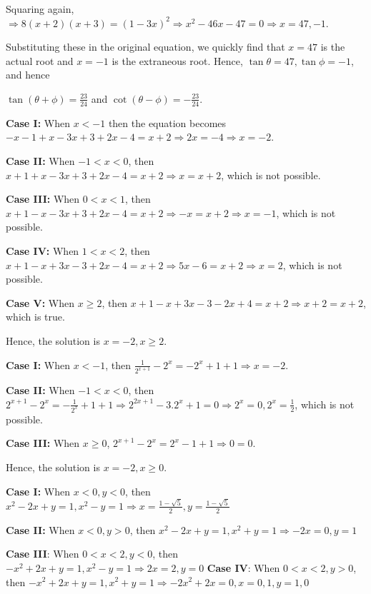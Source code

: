   Squaring again, $\Rightarrow 8(x + 2)(x + 3) = (1 - 3x)^2 \Rightarrow x^2 - 46x - 47 = 0 \Rightarrow x =
  47, -1$.

  Substituting these in the original equation, we quickly find that $x = 47$ is the actual root and $x = -1$
  is the extraneous root. Hence, $\tan\theta = 47, \tan\phi = -1$, and hence

  $\tan(\theta + \phi) = \frac{23}{24}$ and $\cot(\theta - \phi) = -\frac{23}{24}$.
\item {\bf Case I:} When $x < -1$ then the equation becomes $-x - 1 + x - 3x + 3 + 2x - 4 = x + 2 \Rightarrow
  2x = -4\Rightarrow x = -2$.

  {\bf Case II:} When $-1 < x < 0$, then $x + 1 + x - 3x + 3 + 2x - 4 = x + 2\Rightarrow x = x + 2$,
  which is not possible.

  {\bf Case III:} When $0 < x < 1$, then $x + 1 - x - 3x + 3 + 2x - 4 = x + 2 \Rightarrow -x = x + 2
  \Rightarrow x = -1$, which is not possible.

  {\bf Case IV:} When $1 < x < 2$, then $x + 1 - x + 3x - 3 + 2x - 4 = x + 2 \Rightarrow 5x - 6 = x +
  2\Rightarrow x = 2$, which is not possible.

  {\bf Case V:} When $x \geq 2$, then $x + 1 - x + 3x - 3 - 2x + 4 = x + 2 \Rightarrow x + 2 = x + 2$, which
  is true.

  Hence, the solution is $x = -2, x\geq 2$.
\item {\bf Case I:} When $x < -1$, then $\frac{1}{2^{x + 1}} - 2^x = -2^x + 1 + 1 \Rightarrow x = -2$.

  {\bf Case II:} When $-1 < x < 0$, then $2^{x + 1} - 2^x = -\frac{1}{2^x} + 1 + 1\Rightarrow 2^{2x + 1} -
  3.2^x + 1 = 0 \Rightarrow 2^x = 0, 2^x = \frac{1}{2}$, which is not possible.

  {\bf Case III:} When $x \geq 0$, $2^{x  + 1} - 2^x = 2^x - 1 + 1 \Rightarrow 0 = 0$.

  Hence, the solution is $x = -2, x \geq 0$.
\item {\bf Case I:} When $x < 0, y < 0$, then $x^2 - 2x + y = 1, x^2 - y = 1 \Rightarrow x = \frac{1 -
  \sqrt{5}}{2}, y = \frac{1 - \sqrt{5}}{2}$

  {\bf Case II:} When $x < 0, y > 0$, then $x^2 - 2x + y = 1, x^2 + y = 1\Rightarrow -2x = 0, y = 1$

  {\bf Case III}: When $0 < x < 2, y < 0$, then $-x^2 + 2x + y = 1, x^2 - y = 1\Rightarrow 2x = 2, y = 0$
  {\bf Case IV}: When $0 < x < 2, y > 0$, then $-x^2 + 2x + y = 1, x^2 + y = 1\Rightarrow -2x^2 + 2x = 0, x
  = 0, 1, y = 1, 0$

